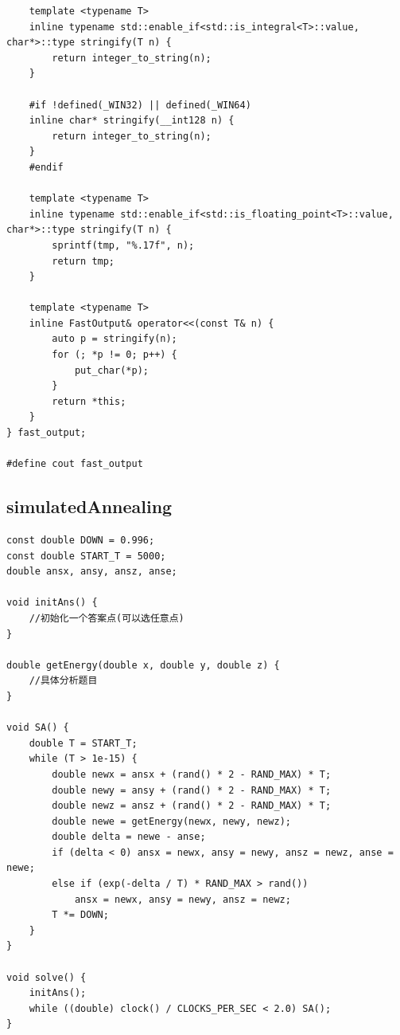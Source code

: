\documentclass[twoside]{article}
\begin{document}
\begin{lstlisting}
    template <typename T>
    inline typename std::enable_if<std::is_integral<T>::value, char*>::type stringify(T n) {
        return integer_to_string(n);
    }
 
    #if !defined(_WIN32) || defined(_WIN64)
    inline char* stringify(__int128 n) {
        return integer_to_string(n);
    }
    #endif
 
    template <typename T>
    inline typename std::enable_if<std::is_floating_point<T>::value, char*>::type stringify(T n) {
        sprintf(tmp, "%.17f", n);
        return tmp;
    }
 
    template <typename T>
    inline FastOutput& operator<<(const T& n) {
        auto p = stringify(n);
        for (; *p != 0; p++) {
            put_char(*p);
        }
        return *this;
    }
} fast_output;
 
#define cout fast_output\end{lstlisting}
\subsection{simulatedAnnealing}
\begin{lstlisting}
const double DOWN = 0.996;
const double START_T = 5000;
double ansx, ansy, ansz, anse;

void initAns() {
    //初始化一个答案点(可以选任意点)
}

double getEnergy(double x, double y, double z) {
    //具体分析题目
}

void SA() {
    double T = START_T;
    while (T > 1e-15) {
        double newx = ansx + (rand() * 2 - RAND_MAX) * T;
        double newy = ansy + (rand() * 2 - RAND_MAX) * T;
        double newz = ansz + (rand() * 2 - RAND_MAX) * T;
        double newe = getEnergy(newx, newy, newz);
        double delta = newe - anse;
        if (delta < 0) ansx = newx, ansy = newy, ansz = newz, anse = newe;
        else if (exp(-delta / T) * RAND_MAX > rand())
            ansx = newx, ansy = newy, ansz = newz;
        T *= DOWN;
    }
}

void solve() {
    initAns();
    while ((double) clock() / CLOCKS_PER_SEC < 2.0) SA();
}

\end{lstlisting}
\end{document}
